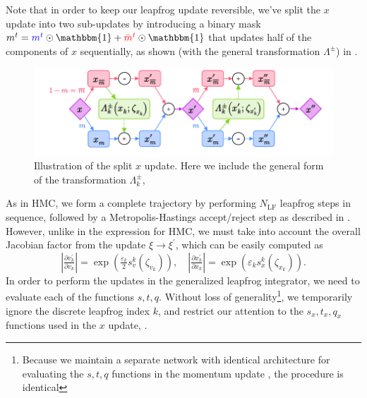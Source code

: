 \documentclass{article} %
\newcommand{\mbart}{\textcolor{red}{\bar{m}^{t}}}
\newcommand{\mt}{\textcolor{blue}{m^{t}}}
\begin{document}
%
Note that in order to keep our leapfrog update reversible, we've split the \(x\) update into two sub-updates by
introducing a binary mask \(m^{t} = \mt\odot\mathbbm{1} + \mbart\odot\mathbbm{1}\) that updates half of the components
of \(x\) sequentially, as shown (with the general transformation \(\Lambda^{\pm}\)) in .
%
\begin{figure}[htpb]
   \centering
   \includegraphics[width=\textwidth]{figures/splitx10.pdf}
   \caption{\label{fig:splitx}Illustration of the split \(x\) update. Here we include the general form of the
   transformation \(\Lambda^{\pm}_{k}\),  }
\end{figure}
%

As in HMC, we form a complete trajectory by performing \(N_{\mathrm{LF}}\) leapfrog steps in sequence, followed by a
Metropolis-Hastings accept/reject step as described in .
%
However, unlike in the expression for HMC, we must take into account the overall Jacobian factor from the update
\(\xi\rightarrow\xi^{\prime}\), which can be easily computed as 
%
\begin{equation}
   \left|\tfrac{\partial v^{\prime}_{k}}{\partial v_{k}}\right| 
   = \exp{\left(\tfrac{\varepsilon_{k}}{2}s^{k}_{v}(\zeta_{v_{k}})\right)},\quad
   \left|\tfrac{\partial x^{\prime}_{k}}{\partial x_{k}}\right| 
   = \exp{\left(\varepsilon_{k} s^{k}_{x}(\zeta_{x_{k}})\right)}.
\end{equation}
%
In order to perform the updates in the generalized leapfrog integrator, we need to evaluate each of the functions
\(s, t, q\).
%
%
Without loss of generality\footnote{Because we maintain a separate network with identical architecture for evaluating
the \(s, t, q\) functions in the momentum update , the procedure is identical},
we temporarily ignore the discrete leapfrog index \(k\), and restrict our attention to the
\(s_{x}, t_{x}, q_{x}\) functions used in the \(x\) update, .
%
\end{document}
